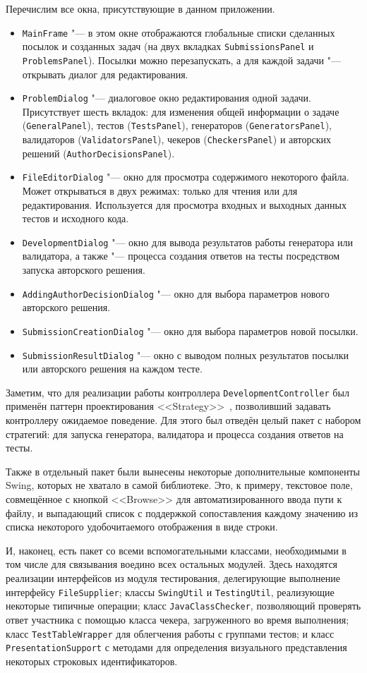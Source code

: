 Перечислим все окна, присутствующие в данном приложении.

\begin{itemize}
\item \texttt{MainFrame} "--- в этом окне отображаются глобальные списки сделанных посылок и созданных задач (на двух вкладках \texttt{Submissions\-Panel} и \texttt{Problems\-Panel}). Посылки можно перезапускать, а для каждой задачи "--- открывать диалог для редактирования. 
\item \texttt{ProblemDialog} "--- диалоговое окно редактирования одной задачи. Присутствует шесть вкладок: для изменения общей информации о задаче (\texttt{General\-Panel}), тестов (\texttt{Tests\-Panel}), генераторов (\texttt{Generators\-Panel}), валидаторов (\texttt{Validators\-Panel}), чекеров (\texttt{Checkers\-Panel}) и авторских решений (\texttt{Author\-Decisions\-Panel}).
\item \texttt{FileEditorDialog} "--- окно для просмотра содержимого некоторого файла. Может открываться в двух режимах: только для чтения или для редактирования. Используется для просмотра входных и выходных данных тестов и исходного кода.
\item \texttt{DevelopmentDialog} "--- окно для вывода результатов работы генератора или валидатора, а также "--- процесса создания ответов на тесты посредством запуска авторского решения.
\item \texttt{AddingAuthorDecisionDialog} "--- окно для выбора параметров нового авторского решения.
\item \texttt{SubmissionCreationDialog} "--- окно для выбора параметров новой посылки.
\item \texttt{SubmissionResultDialog} "--- окно с выводом полных результатов посылки или авторского решения на каждом тесте.
\end{itemize}

Заметим, что для реализации работы контроллера \texttt{Development\-Controller} был применён паттерн проектирования <<Strategy>>~\cite{gamma}, позволивший задавать контроллеру ожидаемое поведение. Для этого был отведён целый пакет с набором стратегий: для запуска генератора, валидатора и процесса создания ответов на тесты.

Также в отдельный пакет были вынесены некоторые дополнительные компоненты Swing, которых не хватало в самой библиотеке. Это, к примеру, текстовое поле, совмещённое с кнопкой <<Browse>> для автоматизированного ввода пути к файлу, и выпадающий список с поддержкой сопоставления каждому значению из списка некоторого удобочитаемого отображения в виде строки.

И, наконец, есть пакет со всеми вспомогательными классами, необходимыми в том числе для связывания воедино всех остальных модулей. Здесь находятся реализации интерфейсов из модуля тестирования, делегирующие выполнение интерфейсу \texttt{File\-Supplier}; классы \texttt{Swing\-Util} и \texttt{Testing\-Util}, реализующие некоторые типичные операции; класс \texttt{Java\-Class\-Checker}, позволяющий проверять ответ участника с помощью класса чекера, загруженного во время выполнения; класс \texttt{Test\-Table\-Wrapper} для облегчения работы с группами тестов; и класс \texttt{Presentation\-Support} с методами для определения визуального представления некоторых строковых идентификаторов.